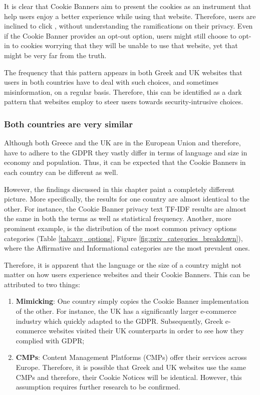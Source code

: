 \documentclass[../main.tex]{subfiles}
\begin{document}
It is clear that Cookie Banners aim to present the cookies as an instrument that help users enjoy a better experience while using that website. Therefore, users are inclined to click , without understanding the ramifications on their privacy. Even if the Cookie Banner provides an opt-out option, users might still choose to opt-in to cookies worrying that they will be unable to use that website, yet that might be very far from the truth.

The frequency that this pattern appears in both Greek and UK websites that users in both countries have to deal with such choices, and sometimes misinformation, on a regular basis. Therefore, this can be identified as a dark pattern that websites employ to steer users towards security-intrusive choices.

\subsubsection{Both countries are very similar}
Although both Greece and the UK are in the European Union and therefore, have to adhere to the GDPR they vastly differ in terms of language and size in economy and population. Thus, it can be expected that the Cookie Banners in each country can be different as well.

However, the findings discussed in this chapter paint a completely different picture. More specifically, the results for one country are almost identical to the other. For instance, the Cookie Banner privacy text TF-IDF results are almost the same in both the terms as well as statistical frequency. Another, more prominent example, is the distribution of the most common privacy options categories (Table \ref{tab:avg_options}, Figure \ref{fig:priv_categories_breakdown}), where the Affirmative and Informational categories are the most prevalent ones. 

Therefore, it is apparent that the language or the size of a country might not matter on how users experience websites and their Cookie Banners. This can be attributed to two things:

\begin{enumerate}
    \item \textbf{Mimicking}: One country simply copies the Cookie Banner implementation of the other. For instance, the UK has a significantly larger e-commerce industry which quickly adapted to the GDPR. Subsequently, Greek e-commerce websites visited their UK counterparts in order to see how they complied with GDPR;
    \item \textbf{CMPs}: Content Management Platforms (CMPs) offer their services across Europe. Therefore, it is possible that Greek and UK websites use the same CMPs and therefore, their Cookie Notices will be identical. However, this assumption requires further research to be confirmed.
\end{enumerate}
\end{document}
